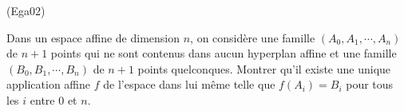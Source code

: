 \begin{tiny}(Ega02)\end{tiny} Dans un espace affine de dimension $n$, on considère une famille $(A_0,A_1,\cdots,A_n)$ de $n+1$ points qui ne sont contenus dans aucun hyperplan affine et une famille $(B_0,B_1,\cdots,B_n)$ de $n+1$ points quelconques. Montrer qu'il existe une unique application affine $f$ de l'espace dans lui même telle que  $f(A_i)=B_i$ pour tous les $i$ entre $0$ et $n$.